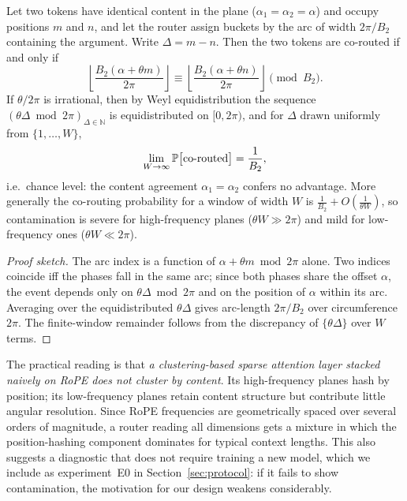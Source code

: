 \begin{proposition}
\label{prop:rope}
Let two tokens have identical content in the plane ($\alpha_1 = \alpha_2 = \alpha$) and occupy positions $m$ and $n$, and let the router assign buckets by the arc of width $2\pi/B_2$ containing the argument. Write $\Delta = m - n$. Then the two tokens are co-routed if and only if
\begin{equation}
  \left\lfloor \frac{B_2(\alpha + \theta m)}{2\pi} \right\rfloor
  \equiv
  \left\lfloor \frac{B_2(\alpha + \theta n)}{2\pi} \right\rfloor \pmod{B_2}.
\end{equation}
If $\theta/2\pi$ is irrational, then by Weyl equidistribution the sequence $(\theta\Delta \bmod 2\pi)_{\Delta \in \mathbb{N}}$ is equidistributed on $[0,2\pi)$, and for $\Delta$ drawn uniformly from $\{1,\dots,W\}$,
\begin{equation}
  \lim_{W\to\infty} \mathbb{P}\big[\text{co-routed}\big] = \frac{1}{B_2},
\end{equation}
i.e.\ chance level: the content agreement $\alpha_1 = \alpha_2$ confers no advantage. More generally the co-routing probability for a window of width $W$ is $\tfrac{1}{B_2} + O\!\left(\tfrac{1}{\theta W}\right)$, so contamination is severe for high-frequency planes ($\theta W \gg 2\pi$) and mild for low-frequency ones ($\theta W \ll 2\pi$).
\end{proposition}

\begin{proof}[Proof sketch]
The arc index is a function of $\alpha + \theta m \bmod 2\pi$ alone. Two indices coincide iff the phases fall in the same arc; since both phases share the offset $\alpha$, the event depends only on $\theta\Delta \bmod 2\pi$ and on the position of $\alpha$ within its arc. Averaging over the equidistributed $\theta\Delta$ gives arc-length $2\pi/B_2$ over circumference $2\pi$. The finite-window remainder follows from the discrepancy of $\{\theta\Delta\}$ over $W$ terms.
\end{proof}

The practical reading is that \emph{a clustering-based sparse attention layer stacked naively on RoPE does not cluster by content}. Its high-frequency planes hash by position; its low-frequency planes retain content structure but contribute little angular resolution. Since RoPE frequencies are geometrically spaced over several orders of magnitude, a router reading all dimensions gets a mixture in which the position-hashing component dominates for typical context lengths. This also suggests a diagnostic that does not require training a new model, which we include as experiment~E0 in Section~\ref{sec:protocol}: if it fails to show contamination, the motivation for our design weakens considerably.

